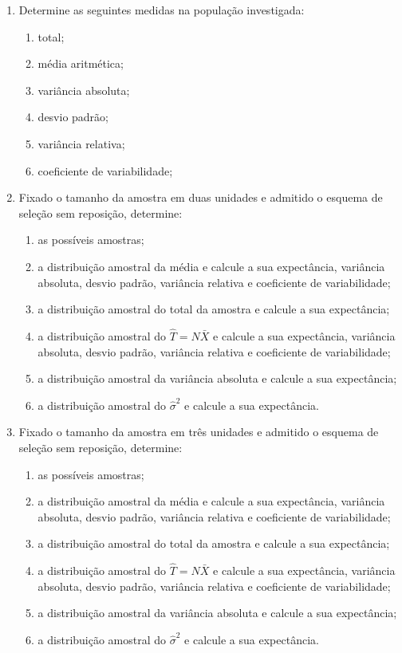 \begin{enumerate}[resume]
\begin{enumerate}
	\item Determine as seguintes medidas na população investigada:
		\begin{enumerate}
		\item total;
		\item média aritmética;
		\item variância absoluta;
		\item desvio padrão;
		\item variância relativa;
		\item coeficiente de variabilidade;
		\end{enumerate}
	
	\item Fixado o tamanho da amostra em duas unidades e admitido o esquema de seleção sem reposição, determine:
		\begin{enumerate}
		\item as possíveis amostras;
		\item a distribuição amostral da média e calcule a sua expectância, variância absoluta, desvio padrão, variância relativa e coeficiente de variabilidade;
		\item a distribuição amostral do total da amostra e calcule a sua expectância;
		\item a distribuição amostral do $\hat{T} = N\bar{X}$ e calcule a sua expectância, variância absoluta, desvio padrão, variância relativa e coeficiente de variabilidade;
		\item a distribuição amostral da variância absoluta e calcule a sua expectância;
		\item a distribuição amostral do $\hat{\sigma}^{2}$ e calcule a sua expectância.
		\end{enumerate}

	\item Fixado o tamanho da amostra em três unidades e admitido o esquema de seleção sem reposição, determine:
		\begin{enumerate}
		\item as possíveis amostras;
		\item a distribuição amostral da média e calcule a sua expectância, variância absoluta, desvio padrão, variância relativa e coeficiente de variabilidade;
		\item a distribuição amostral do total da amostra e calcule a sua expectância;
		\item a distribuição amostral do $\hat{T} = N\bar{X}$ e calcule a sua expectância, variância absoluta, desvio padrão, variância relativa e coeficiente de variabilidade;
		\item a distribuição amostral da variância absoluta e calcule a sua expectância;
		\item a distribuição amostral do $\hat{\sigma}^{2}$ e calcule a sua expectância.
		\end{enumerate}


\end{enumerate}
\end{enumerate}

